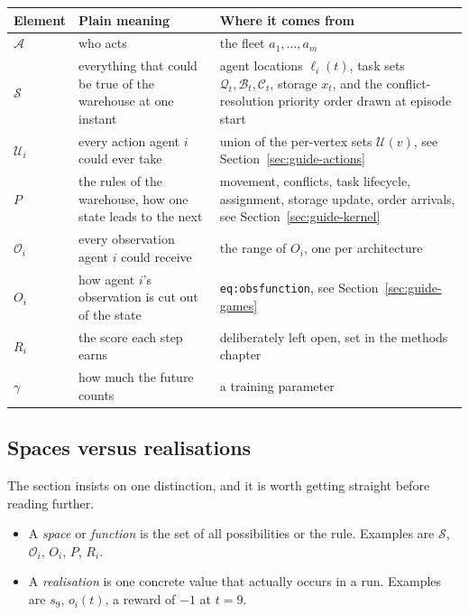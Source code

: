 \documentclass[11pt,a4paper]{article}
\begin{document}
\begin{center}
\small
\begin{tabular}{lp{4.3cm}p{6.4cm}}
  \toprule
  Element & Plain meaning & Where it comes from \\
  \midrule
  $\mathcal{A}$ & who acts & the fleet $a_1,\dots,a_m$ \\
  $\mathcal{S}$ & everything that could be true of the warehouse at one instant &
      agent locations $\ell_i(t)$, task sets $\mathcal{Q}_t,\mathcal{B}_t,\mathcal{C}_t$, storage $x_t$, and the conflict-resolution priority order drawn at episode start \\
  $\mathcal{U}_i$ & every action agent $i$ could ever take &
      union of the per-vertex sets $\mathcal{U}(v)$, see Section~\ref{sec:guide-actions} \\
  $P$ & the rules of the warehouse, how one state leads to the next &
      movement, conflicts, task lifecycle, assignment, storage update, order arrivals, see Section~\ref{sec:guide-kernel} \\
  $\mathcal{O}_i$ & every observation agent $i$ could receive & the range of $O_i$, one per architecture \\
  $O_i$ & how agent $i$'s observation is cut out of the state & \texttt{eq:obsfunction}, see Section~\ref{sec:guide-games} \\
  $R_i$ & the score each step earns & deliberately left open, set in the methods chapter \\
  $\gamma$ & how much the future counts & a training parameter \\
  \bottomrule
\end{tabular}
\end{center}

\subsection{Spaces versus realisations}

The section insists on one distinction, and it is worth getting straight
before reading further.

\begin{itemize}[leftmargin=*]
  \item A \emph{space} or \emph{function} is the set of all possibilities
        or the rule. Examples are $\mathcal{S}$, $\mathcal{O}_i$, $O_i$, $P$, $R_i$.
  \item A \emph{realisation} is one concrete value that actually occurs
        in a run. Examples are $s_9$, $o_i(t)$, a reward of $-1$ at $t=9$.
\end{itemize}
\end{document}
